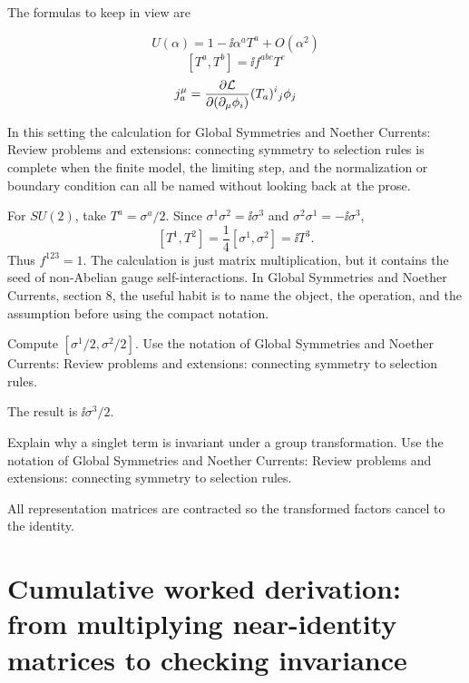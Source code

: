 The formulas to keep in view are

\[
  U(\alpha)=1-\ii\alpha^aT^a+O(\alpha^2)
\]
\[
  [T^a,T^b]=\ii f^{abc}T^c
\]
\[
  j^\mu_a=\frac{\partial\mathcal L}{\partial(\partial_\mu\phi_i)}(T_a)^i{}_j\phi_j
\]

In this setting the calculation for Global Symmetries and Noether Currents: Review problems and extensions: connecting symmetry to selection rules is complete when the finite model, the limiting step, and the normalization or boundary condition can all be named without looking back at the prose.




\begin{example}
For \(SU(2)\), take \(T^a=\sigma^a/2\).  Since \(\sigma^1\sigma^2=\ii\sigma^3\) and \(\sigma^2\sigma^1=-\ii\sigma^3\),
\[
  [T^1,T^2]=\frac14[\sigma^1,\sigma^2]=\ii T^3.
\]
Thus \(f^{123}=1\).  The calculation is just matrix multiplication, but it contains the seed of non-Abelian gauge self-interactions.  In Global Symmetries and Noether Currents, section 8, the useful habit is to name the object, the operation, and the assumption before using the compact notation.
\end{example}



\begin{exercise}
Compute \([\sigma^1/2,\sigma^2/2]\).  Use the notation of Global Symmetries and Noether Currents: Review problems and extensions: connecting symmetry to selection rules.
\begin{answer}
The result is \(\ii\sigma^3/2\).
\end{answer}
\end{exercise}

\begin{exercise}
Explain why a singlet term is invariant under a group transformation.  Use the notation of Global Symmetries and Noether Currents: Review problems and extensions: connecting symmetry to selection rules.
\begin{answer}
All representation matrices are contracted so the transformed factors cancel to the identity.
\end{answer}
\end{exercise}



\section{Cumulative worked derivation: from multiplying near-identity matrices to checking invariance}

